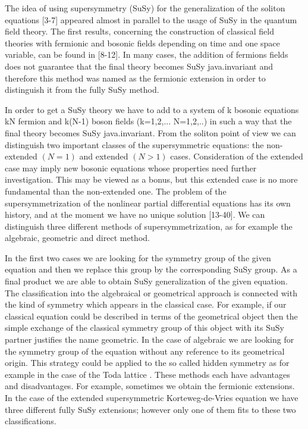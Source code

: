         The idea of using supersymmetry (SuSy) for the
generalization of the soliton equations [3-7] appeared almost in parallel
to the usage of SuSy in the quantum field theory. The first results,
concerning the construction of classical field theories  with fermionic
and bosonic fields
depending on time and one space variable, can be found in [8-12].
In many cases, the  addition of fermions fields does not guarantee that the
final theory becomes SuSy java.invariant and therefore this method was named as
the fermionic extension in order to distinguish it from the fully SuSy method.

        In order to get a SuSy theory  we have to add to a system of k bosonic
equations kN fermion and k(N-1) boson fields (k=1,2,... N=1,2,..) in such a way
that the final theory becomes SuSy java.invariant.  From the soliton point of view
we can distinguish two important classes of the supersymmetric equations:
the non-extended $(N = 1)$ and extended $( N > 1 )$ cases. Consideration of the
extended case may imply new bosonic equations whose properties need further
investigation. This may be viewed as a bonus, but this extended case is no
more fundamental than the non-extended one. The problem of the
supersymmetrization of the nonlinear partial differential equations has its
own history, and at the moment we have no unique solution [13-40].
We can distinguish three different methods of
supersymmetrization, as for example the algebraic, geometric and direct method.

        In the first two cases we are looking for the symmetry group of the
given equation and then we replace this group by the corresponding
SuSy group. As a final product we are able to obtain
SuSy generalization
of the given equation. The classification into  the algebraical or
geometrical approach is connected with the kind of symmetry which appears
in the classical case. For example, if our classical equation could be
described  in terms of the geometrical object then the simple exchange
of the classical symmetry group of this object with its SuSy partner
justifies the name geometric. In the case of algebraic we are looking for the
symmetry group of the equation without any reference to its
geometrical origin. This strategy could be applied to the so called
hidden symmetry as for example in the case of the Toda lattice .
These methods each have advantages and disadvantages. For example,
sometimes we obtain the fermionic extensions. In the case of the
extended supersymmetric Korteweg-de-Vries equation  we have three different
fully SuSy extensions; however only one of them fits to these two
classifications.

